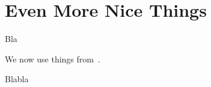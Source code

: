 
\chapter{Even More Nice Things}\label{chapter:evenmore}

\noindent
Bla %

We now use things from~\cite{Bryant86:bdds}.

Blabla %
